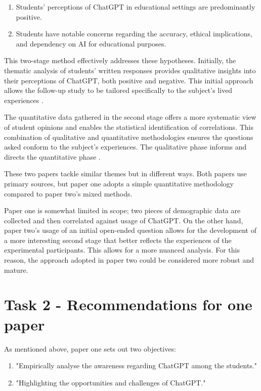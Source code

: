 \documentclass[12pt]{article}
\begin{document}
\begin{enumerate}
    \item Students' perceptions of ChatGPT in educational settings are predominantly positive.
    \item Students have notable concerns regarding the accuracy, ethical implications, and dependency on AI for educational purposes.
\end{enumerate}

This two-stage method effectively addresses these hypotheses. Initially, the thematic analysis of students' written responses provides qualitative insights into their perceptions of ChatGPT, both positive and negative. This initial approach allows the follow-up study to be tailored specifically to the subject's lived experiences \cite{mertens}.

The quantitative data gathered in the second stage offers a more systematic view of student opinions and enables the statistical identification of correlations. This combination of qualitative and quantitative methodologies ensures the questions asked conform to the subject's experiences. The qualitative phase informs and directs the quantitative phase \cite{merriam}.

These two papers tackle similar themes but in different ways. Both papers use primary sources, but paper one adopts a simple quantitative methodology compared to paper two's mixed methods.

Paper one is somewhat limited in scope; two pieces of demographic data are collected and then correlated against usage of ChatGPT. On the other hand, paper two's usage of an initial open-ended question allows for the development of a more interesting second stage that better reflects the experiences of the experimental participants. This allows for a more nuanced analysis. For this reason, the approach adopted in paper two could be considered more robust and mature.


\section{Task 2 - Recommendations for one paper}

As mentioned above, paper one sets out two objectives:

\begin{enumerate}
    \item "Empirically analyse the awareness regarding ChatGPT among the students."
    \item "Highlighting the opportunities and challenges of ChatGPT." \cite{paper2}
\end{enumerate}
\end{document}
